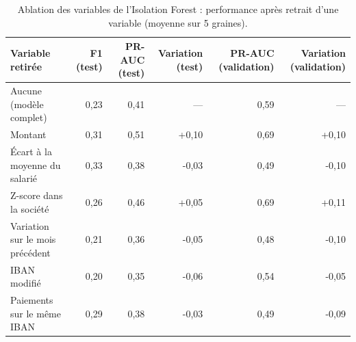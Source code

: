 \begin{table}[htbp]
\centering
\caption{Ablation des variables de l'Isolation Forest : performance après retrait d'une variable (moyenne sur 5 graines).}
\label{tab:ablation_variables}
\small
\begin{tabular}{lrrrrr}
\toprule
\textbf{Variable retirée} & \textbf{F1 (test)} & \textbf{PR-AUC (test)} & \textbf{Variation (test)} & \textbf{PR-AUC (validation)} & \textbf{Variation (validation)} \\
\midrule
Aucune (modèle complet) & 0,23 & 0,41 & — & 0,59 & — \\
Montant & 0,31 & 0,51 & +0,10 & 0,69 & +0,10 \\
Écart à la moyenne du salarié & 0,33 & 0,38 & -0,03 & 0,49 & -0,10 \\
Z-score dans la société & 0,26 & 0,46 & +0,05 & 0,69 & +0,11 \\
Variation sur le mois précédent & 0,21 & 0,36 & -0,05 & 0,48 & -0,10 \\
IBAN modifié & 0,20 & 0,35 & -0,06 & 0,54 & -0,05 \\
Paiements sur le même IBAN & 0,29 & 0,38 & -0,03 & 0,49 & -0,09 \\
\bottomrule
\end{tabular}
\end{table}
